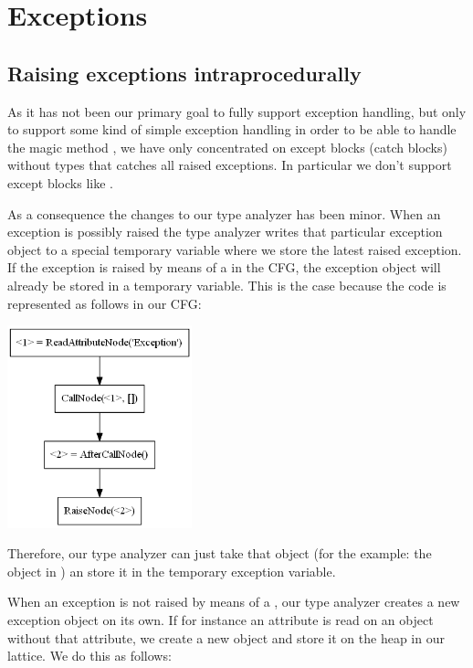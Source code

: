 \chapter{Exceptions}
\section{Raising exceptions intraprocedurally}
As it has not been our primary goal to fully support exception handling, but only to support some kind of simple exception handling in order to be able to handle the magic method , we have only concentrated on except blocks (catch blocks) without types that catches all raised exceptions. In particular we don't support except blocks like .

As a consequence the changes to our type analyzer has been minor. When an exception is possibly raised the type analyzer writes that particular exception object to a special temporary variable where we store the latest raised exception. If the exception is raised by means of a  in the CFG, the exception object will already be stored in a temporary variable. This is the case because the code  is represented as follows in our CFG:

\begin{listing}[H]
	\begin{center}
		\includegraphics[width=0.4\textwidth]{images/raiseexception.png}
	\end{center}
	\vspace{-20pt}
\end{listing}

Therefore, our type analyzer can just take that object (for the example: the object in ) an store it in the temporary exception variable.

When an exception is not raised by means of a , our type analyzer creates a new exception object on its own. If for instance an attribute is read on an object without that attribute, we create a new  object and store it on the heap in our lattice. We do this as follows:

